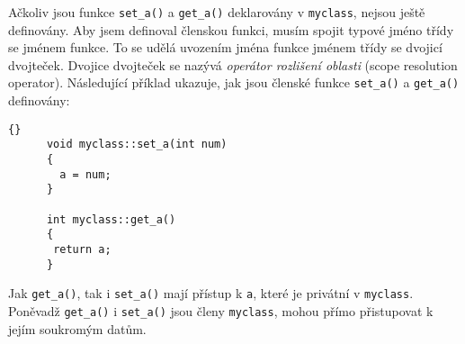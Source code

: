 {      Ačkoliv jsou funkce \lstinline[basicstyle=\ttfamily]!set_a()! a 
      \lstinline[basicstyle=\ttfamily]!get_a()!  deklarovány v 
      \lstinline[basicstyle=\ttfamily]!myclass!, nejsou ještě definovány. Aby jsem definoval 
      členskou funkci, musím spojit typové jméno třídy se jménem funkce. To se udělá uvozením jména 
      funkce jménem třídy se dvojicí dvojteček. Dvojice dvojteček se nazývá \textit{operátor 
      rozlišení oblasti} (scope resolution operator). Následující příklad ukazuje, jak jsou členské 
      funkce \lstinline[basicstyle=\ttfamily]!set_a()! a    
      \lstinline[basicstyle=\ttfamily]!get_a()! definovány:
      \begin{lstlisting}{}
      void myclass::set_a(int num)
      {
        a = num;
      }
  
      int myclass::get_a()
      {
       return a;
      }
      \end{lstlisting}
      Jak \lstinline[basicstyle=\ttfamily]!get_a()!, tak i 
      \lstinline[basicstyle=\ttfamily]!set_a()! 
      mají přístup k \lstinline[basicstyle=\ttfamily]!a!, které je privátní v 
      \lstinline[basicstyle=\ttfamily]!myclass!. Poněvadž
      \lstinline[basicstyle=\ttfamily]!get_a()! i \lstinline[basicstyle=\ttfamily]!set_a()! jsou 
      členy \lstinline[basicstyle=\ttfamily]!myclass!, mohou přímo přistupovat k jejím soukromým 
      datům.
  
}
